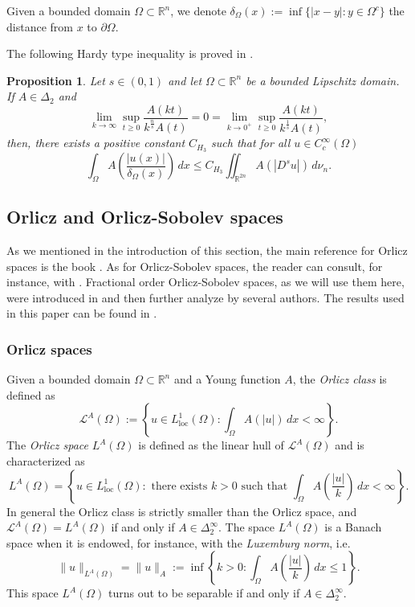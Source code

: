 \documentclass[12pt,reqno]{amsart}
\newtheorem{prop}[thm]{Proposition}
\theoremstyle{definition}
\theoremstyle{remark}
\numberwithin{equation}{section}
\begin{document}
Given a bounded domain $\Omega\subset \mathbb{R}^n$, we denote $\delta_\Omega(x):=\inf\{|x-y|\colon y \in \Omega^c\}$ the distance from $x$ to $\partial \Omega$. 

The following Hardy type inequality is proved in \cite[Theorem 1.5]{BKS}.
\begin{prop} \label{hardy2}
Let $s\in (0,1)$ and let $\Omega\subset \mathbb{R}^n$ be a bounded Lipschitz  domain. If $A\in \Delta_2$ and
\begin{equation} \label{cond3}
\lim_{k \to \infty}  \sup_{t\geq 0} \frac{A(k t)}{k^\frac{n}{s}A(t)}=0 =  \lim_{k\to 0^+}  \sup_{t\geq 0} \frac{A(k t)}{k^\frac1s A(t)},
\end{equation}
then, there exists a positive constant $C_{H_3}$ such that for all $u\in C^\infty_c(\Omega)$ 
$$
 \int_{\Omega} A\left( \frac{|u(x)|}{\delta_\Omega(x)}\right)\,dx \leq C_{H_3} \iint_{\mathbb{R}^{2n}} A(|D^s u|) \,d\nu_n.
$$

\end{prop}



\subsection{Orlicz and Orlicz-Sobolev spaces}
As we mentioned in the introduction of this section, the main reference for Orlicz spaces is the book \cite{KR}. As for Orlicz-Sobolev spaces, the reader can consult, for instance, with \cite{Gossez}.    Fractional order Orlicz-Sobolev spaces, as we will use them here, were introduced in \cite{FBS19} and then further analyze by several authors. The results used in this paper can be  found in \cite{ACPS2, ACPS, FBSp24}.

\subsubsection{Orlicz spaces}
Given a bounded domain $\Omega\subset \mathbb{R}^n$  and a Young function $A$, the \emph{Orlicz class} is defined as
$$
\mathcal{L}^A(\Omega) :=\left\{u\in L^1_\text{loc}(\Omega)\colon \int_\Omega A(|u|)\, dx<\infty\right\}.
$$ 
The \emph{Orlicz space} $L^A(\Omega)$ is defined as the linear hull of $\mathcal{L}^A(\Omega)$ and is characterized as
$$
L^A(\Omega) = \left\{u\in L^1_\text{loc}(\Omega)\colon \text{ there exists } k>0 \text{ such that }  \int_\Omega A\left(\frac{|u|}{k}\right)\, dx<\infty\right\}.
$$
In general the Orlicz class is strictly smaller than the Orlicz space, and $\mathcal{L}^A(\Omega) = L^A(\Omega)$ if and only if $A\in \Delta_2^\infty$. The space $L^A(\Omega)$ is a Banach space when it is endowed, for instance, with the {\em Luxemburg norm}, i.e.
$$
\|u\|_{L^A(\Omega)} = \|u\|_A :=\inf\left\{k>0\colon  \int_\Omega A\left(\frac{|u|}{k}\right)\, dx\le 1\right\}.
$$
\noindent This space $L^A(\Omega)$ turns out to be separable if and only if $A\in \Delta_2^\infty$.
\end{document}
